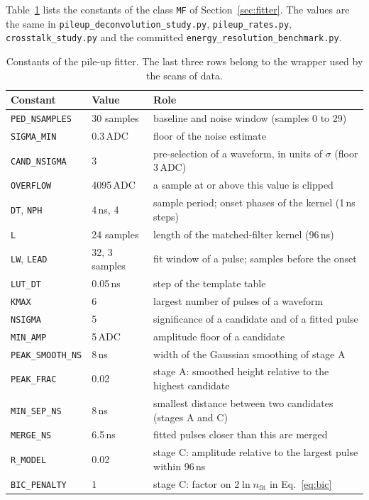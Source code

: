 \documentclass[11pt]{article}
\newcommand{\code}[1]{\texttt{#1}}
\begin{document}
Table~\ref{tab:mfconst} lists the constants of the class \code{MF} of Section~\ref{sec:fitter}. The values are the same in \code{pileup\_deconvolution\_study.py}, \code{pileup\_rates.py}, \code{crosstalk\_study.py} and the committed \code{energy\_resolution\_benchmark.py}.

\begin{table}[htbp]
\centering
\caption{Constants of the pile-up fitter. The last three rows belong to the wrapper used by the scans of data.}
\label{tab:mfconst}
\small
\begin{tabular}{lll}
\toprule
Constant & Value & Role \\
\midrule
\code{PED\_NSAMPLES} & 30 samples & baseline and noise window (samples 0 to 29) \\
\code{SIGMA\_MIN} & 0.3\,ADC & floor of the noise estimate \\
\code{CAND\_NSIGMA} & 3 & pre-selection of a waveform, in units of $\sigma$ (floor 3\,ADC) \\
\code{OVERFLOW} & 4095\,ADC & a sample at or above this value is clipped \\
\code{DT}, \code{NPH} & 4\,ns, 4 & sample period; onset phases of the kernel (1\,ns steps) \\
\code{L} & 24 samples & length of the matched-filter kernel (96\,ns) \\
\code{LW}, \code{LEAD} & 32, 3 samples & fit window of a pulse; samples before the onset \\
\code{LUT\_DT} & 0.05\,ns & step of the template table \\
\code{KMAX} & 6 & largest number of pulses of a waveform \\
\code{NSIGMA} & 5 & significance of a candidate and of a fitted pulse \\
\code{MIN\_AMP} & 5\,ADC & amplitude floor of a candidate \\
\code{PEAK\_SMOOTH\_NS} & 8\,ns & width of the Gaussian smoothing of stage A \\
\code{PEAK\_FRAC} & 0.02 & stage A: smoothed height relative to the highest candidate \\
\code{MIN\_SEP\_NS} & 8\,ns & smallest distance between two candidates (stages A and C) \\
\code{MERGE\_NS} & 6.5\,ns & fitted pulses closer than this are merged \\
\code{R\_MODEL} & 0.02 & stage C: amplitude relative to the largest pulse within 96\,ns \\
\code{BIC\_PENALTY} & 1 & stage C: factor on $2 \ln n_{\mathrm{fit}}$ in Eq.~\eqref{eq:bic} \\

\end{tabular}
\end{table}
\end{document}
